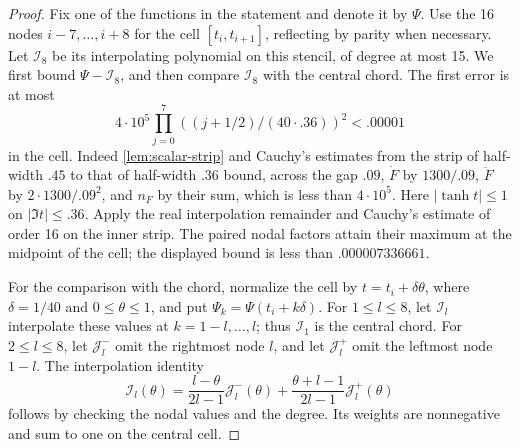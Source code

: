 \begin{proof}
Fix one of the functions in the statement and denote it by $\Psi$. Use the 16 nodes $i-7,\ldots,i+8$ for the cell $[t_i,t_{i+1}]$, reflecting by parity when necessary. Let $\mathcal{I}_8$ be its interpolating polynomial on this stencil, of degree at most 15. We first bound $\Psi-\mathcal{I}_8$, and then compare $\mathcal{I}_8$ with the central chord. The first error is at most
\[
 4\cdot10^5 \prod_{j=0}^7((j+1/2)/(40\cdot .36))^2 < .00001
\]
in the cell. Indeed \cref{lem:scalar-strip} and Cauchy's estimates from the strip of half-width $.45$ to that of half-width $.36$ bound, across the gap $.09$, $\dot F$ by $1300/.09$, $\ddot F$ by $2\cdot1300/.09^2$, and $n_F$ by their sum, which is less than $4\cdot10^5$. Here $|\tanh t|\le1$ on $|\Im t|\le.36$. Apply the real interpolation remainder and Cauchy's estimate of order 16 on the inner strip. The paired nodal factors attain their maximum at the midpoint of the cell; the displayed bound is less than $.000007336661$.

For the comparison with the chord, normalize the cell by $t=t_i+\delta\theta$, where $\delta=1/40$ and $0\le\theta\le1$, and put $\Psi_k=\Psi(t_i+k\delta)$. For $1\le l\le8$, let $\mathcal{I}_l$ interpolate these values at $k=1-l,\ldots,l$; thus $\mathcal{I}_1$ is the central chord. For $2\le l\le8$, let $\mathcal{J}_l^-$ omit the rightmost node $l$, and let $\mathcal{J}_l^+$ omit the leftmost node $1-l$. The interpolation identity
\[
 \mathcal{I}_l(\theta)
 =\frac{l-\theta}{2l-1}\mathcal{J}_l^-(\theta)
  +\frac{\theta+l-1}{2l-1}\mathcal{J}_l^+(\theta)
\]
follows by checking the nodal values and the degree. Its weights are nonnegative and sum to one on the central cell.


\end{proof}
